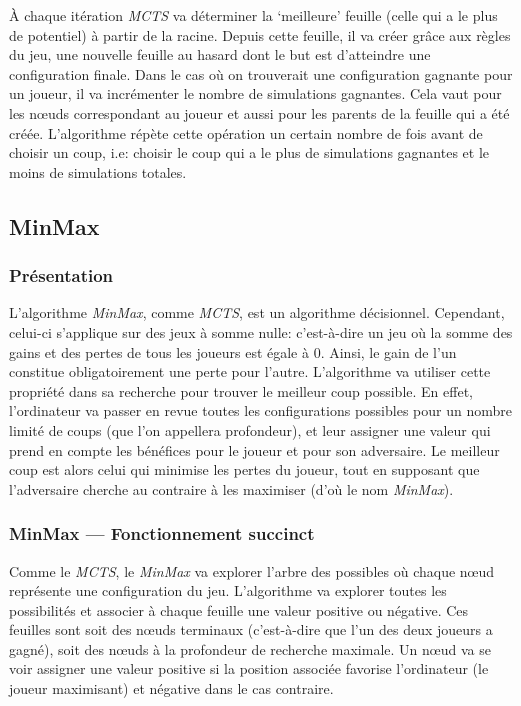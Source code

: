 À chaque itération \emph{MCTS} va déterminer la `meilleure' feuille (celle qui a le plus de potentiel) à partir de la racine.
Depuis cette feuille, il va créer grâce aux règles du jeu, une nouvelle feuille au hasard dont le but est d'atteindre une configuration finale.
Dans le cas où on trouverait une configuration gagnante pour un joueur, il va incrémenter le nombre de simulations gagnantes.
Cela vaut pour les nœuds correspondant au joueur et aussi pour les parents de la feuille qui a été créée.\@
L'algorithme répète cette opération un certain nombre de fois avant de choisir un coup, i.e: choisir le coup qui a le plus de simulations
gagnantes et le moins de simulations totales.



\subsection{MinMax}

\subsubsection{Présentation}
L'algorithme \emph{MinMax}, comme \emph{MCTS}, est un algorithme décisionnel. Cependant, celui-ci s'applique sur des jeux à somme nulle: c'est-à-dire
un jeu où la somme des gains et des pertes de tous les joueurs est égale à 0. Ainsi, le gain de l'un constitue 
obligatoirement une perte pour l'autre. L'algorithme va utiliser cette propriété dans sa recherche pour trouver le meilleur coup possible.
En effet, l'ordinateur va passer en revue toutes les configurations possibles pour un nombre limité de coups (que l'on appellera profondeur), 
et leur assigner une valeur qui prend en compte les bénéfices pour le joueur et pour son adversaire. Le meilleur coup est alors celui qui 
minimise les pertes du joueur, tout en supposant que l'adversaire cherche au contraire à les maximiser (d'où le nom \emph{MinMax}).

\subsubsection{MinMax --- Fonctionnement succinct}
Comme le \emph{MCTS}, le \emph{MinMax} va explorer l'arbre des possibles où chaque nœud représente une configuration du jeu. 
L'algorithme va explorer toutes les possibilités et associer à chaque feuille une valeur positive ou négative. Ces feuilles sont
soit des nœuds terminaux (c'est-à-dire que l'un des deux joueurs a gagné), soit des nœuds à la profondeur de recherche maximale.
Un nœud va se voir assigner une valeur positive si la position associée favorise l'ordinateur (le joueur maximisant) 
et négative dans le cas contraire.

